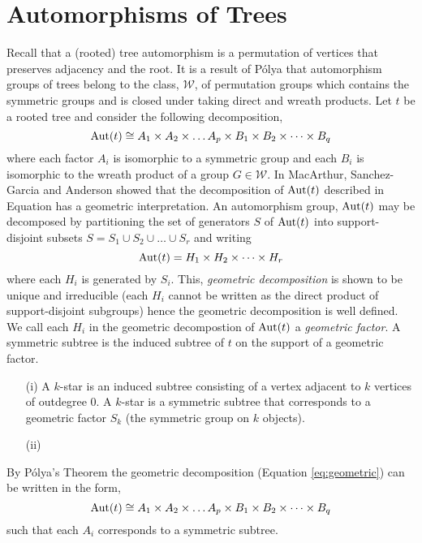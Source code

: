 \section{Automorphisms of Trees}
Recall that a (rooted) tree automorphism is a permutation of vertices that preserves adjacency and the root.  It is a result of P\'{o}lya that automorphism 
groups of trees belong to the class, $\mathcal{W}$, of permutation groups which contains the symmetric groups and is closed under taking direct and wreath products.  Let $t$ 
be a rooted tree and consider the following decomposition,
\begin{equation}\label{eq:decomposition}
 \operatorname{Aut}(t) \cong A_1 \times A_2 \times \dots A_p \times B_1 \times B_2 \times \dots \times B_q  
\end{equation}
where each factor $A_i$ is isomorphic to a symmetric group and each $B_i$ is isomorphic to the wreath product of a group $G \in \mathcal{W}$.  In \cite{} MacArthur, 
Sanchez-Garcia and Anderson showed that the decomposition of $\operatorname{Aut}(t)$ described in Equation \label{eq:decomposition} has a geometric interpretation.  An 
automorphism group, $\operatorname{Aut}(t)$ may be decomposed by partitioning the set of generators $S$ of $\operatorname{Aut}(t)$ into support-disjoint subsets 
$S = S_1 \cup S_2 \cup \dots \cup S_r$ and writing
\begin{equation}\label{eq:geometric}
 \operatorname{Aut}(t) = H_1 \times H_2 \times \dots \times H_r
\end{equation}
where each $H_i$ is generated by $S_i$.  This, \emph{geometric decomposition} is shown \cite{} to be unique and irreducible (each $H_i$ cannot be written as the direct product of support-disjoint subgroups) hence the geometric decomposition is well defined. We call each $H_i$ in the geometric decompostion of $\operatorname{Aut}(t)$ a \emph{geometric factor}. A symmetric subtree is the induced subtree of $t$ on the support of a geometric factor.
\begin{ex}
\begin{itemize}
 \item[(i)]  A $k$-star is an induced subtree consisting of a vertex adjacent to $k$ vertices of outdegree 0.  A $k$-star is a symmetric subtree that corresponds to a geometric factor $S_k$ (the symmetric group on $k$ objects).  
 \item[(ii)] %
\end{itemize}
\end{ex}
By P\'{o}lya's Theorem the geometric decomposition (Equation \ref{eq:geometric}) can be written in the form,
\begin{equation}
 \operatorname{Aut}(t) \cong A_1 \times A_2 \times \dots A_p \times B_1 \times B_2 \times \dots \times B_q  
\end{equation}
such that each $A_i$ corresponds to a symmetric subtree.  

